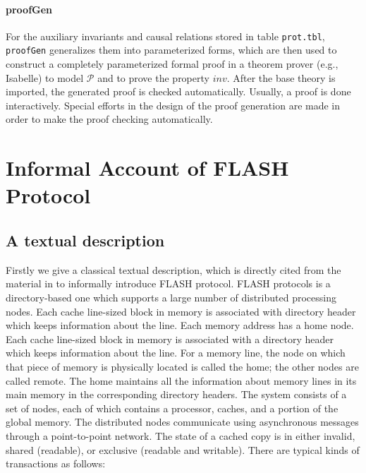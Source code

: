 \documentclass{llncs}
\begin{document}
\paragraph{proofGen} For the auxiliary invariants and causal relations stored in table {\tt prot.tbl}, {\tt proofGen} generalizes them  into  parameterized forms, which are then used to construct a completely parameterized formal proof in a theorem prover (e.g., Isabelle) to model $\mathcal{P}$ and to prove the property $inv$. After the base theory is imported, the generated proof is checked automatically.  Usually, a proof is done interactively. Special efforts in the design of the proof generation are made in order to make the proof checking automatically.





\section{Informal Account of FLASH Protocol\label{sec:informalOfFLASH}}
\subsection{A textual description}
Firstly we give a classical textual description, which is directly cited from the material in \cite{Park2000} to informally introduce FLASH protocol.
FLASH protocols is a directory-based one which supports a large number of distributed processing nodes. Each cache line-sized block in memory is associated with directory header which keeps information about the line. Each memory address has a home node. Each cache line-sized block in memory is associated
with a directory header which keeps information about the line. For a memory line, the
node on which that piece of memory is physically located is called the home; the other
nodes are called remote. The home maintains all the information about memory lines in
its main memory in the corresponding directory headers.
The system consists of a set of nodes, each of which contains a processor, caches, and
a portion of the global memory. The distributed nodes communicate using asynchronous
messages through a point-to-point network. The state of a cached copy is in either invalid,
shared (readable), or exclusive (readable and writable). There are typical kinds of transactions as follows:
\end{document}
